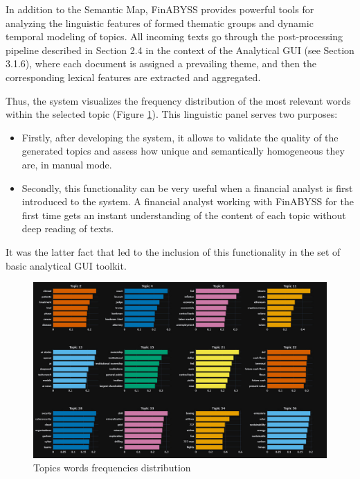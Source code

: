 In addition to the Semantic Map, FinABYSS provides powerful tools for analyzing the linguistic features
of formed thematic groups and dynamic temporal modeling of topics. All incoming texts go through
the post-processing pipeline described in Section 2.4 in the context of the Analytical GUI (see Section 3.1.6),
where each document is assigned a prevailing theme, and then the corresponding lexical features are extracted
and aggregated.

Thus, the system visualizes the frequency distribution of the most relevant words within the selected topic
(Figure \ref{fig:topics_words_freqs}). This linguistic panel serves two purposes:

\begin{itemize}
    \item Firstly, after developing the system, it allows to validate the quality of the generated topics
    and assess how unique and semantically homogeneous they are, in manual mode.
    \item Secondly, this functionality can be very useful when a financial analyst is first introduced
    to the system. A financial analyst working with FinABYSS for the first time gets an instant understanding
    of the content of each topic without deep reading of texts.
\end{itemize}

It was the latter fact that led to the inclusion of this functionality in the set of basic analytical GUI toolkit.

\begin{figure}[H]
    \centering
    \includegraphics[width=1\linewidth]{img/topics_words_freqs.png}
    \caption{Topics words frequencies distribution}
    \label{fig:topics_words_freqs}
\end{figure}

